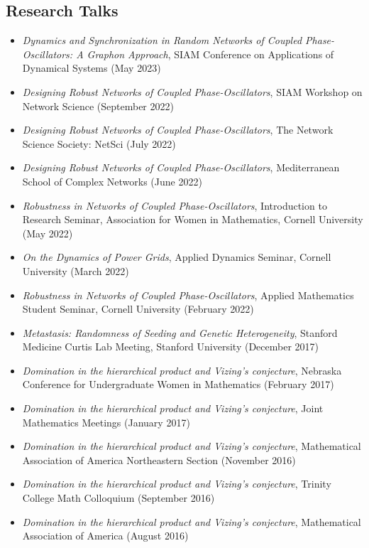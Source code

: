 \documentclass[margin]{res} %
\begin{document}
\begin{resume}
\subsection{Research Talks}
\begin{itemize}
    \item \textit{Dynamics and Synchronization in Random Networks of Coupled Phase-Oscillators: A Graphon Approach}, SIAM Conference on Applications of Dynamical Systems (May 2023)
    \item \textit{Designing Robust Networks of Coupled Phase-Oscillators}, SIAM Workshop on Network Science (September 2022)
    \item \textit{Designing Robust Networks of Coupled Phase-Oscillators}, The Network Science Society: NetSci (July 2022) 
    \item \textit{Designing Robust Networks of Coupled Phase-Oscillators}, Mediterranean School of Complex Networks (June 2022)
    \item \textit{Robustness in Networks of Coupled Phase-Oscillators}, Introduction to Research Seminar, Association for Women in Mathematics, Cornell University (May 2022)
    \item \textit{On the Dynamics of Power Grids}, Applied Dynamics Seminar, Cornell University (March 2022)
    \item \textit{Robustness in Networks of Coupled Phase-Oscillators}, Applied Mathematics Student Seminar, Cornell University (February 2022)
    \item \textit{Metastasis: Randomness of Seeding and Genetic Heterogeneity}, Stanford Medicine Curtis Lab Meeting, Stanford University (December 2017)
    \item \textit{Domination in the hierarchical product and Vizing’s conjecture}, Nebraska Conference for Undergraduate Women in Mathematics (February 2017)
    \item \textit{Domination in the hierarchical product and Vizing’s conjecture}, Joint Mathematics Meetings (January 2017)
    \item \textit{Domination in the hierarchical product and Vizing’s conjecture}, Mathematical Association of America Northeastern Section (November 2016)
    \item \textit{Domination in the hierarchical product and Vizing’s conjecture}, Trinity College Math Colloquium (September 2016)
    \item \textit{Domination in the hierarchical product and Vizing’s conjecture}, Mathematical Association of America (August 2016)
\end{itemize}

\end{resume}
\end{document}
